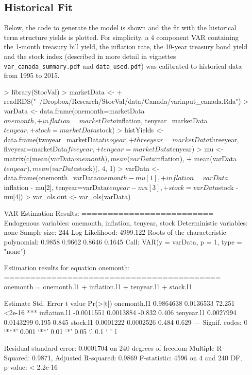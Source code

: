 \documentclass[12pt]{article}
\begin{document}
\subsection{Historical Fit}

\medskip
Below, the code to generate the model is shown and the fit with the historical term structure
yields is plotted. For simplicity, a 4 component VAR containing the 1-month treasury bill yield,
the inflation rate, the 10-year treasury bond yield and the stock index (described in more 
detail in vignettes \texttt{var\_canada\_summary.pdf} and \texttt{data\_used.pdf}) was calibrated
to historical data from 1995 to 2015.

\begin{Schunk}
\begin{Sinput}
> library(StocVal)
> marketData <- 
+   readRDS("~/Dropbox/Research/StocVal/data/Canada/varinput_canada.Rda")
> varData <- data.frame(onemonth=marketData$onemonth,
+   inflation=marketData$inflation, tenyear=marketData$tenyear,
+   stock=marketData$stock)
> histYields <- data.frame(twoyear=marketData$twoyear, 
+   threeyear=marketData$threeyear, fiveyear=marketData$fiveyear, 
+   tenyear=marketData$tenyear)
> mu <- matrix(c(mean(varData$onemonth), mean(varData$inflation),
+   mean(varData$tenyear), mean(varData$stock)), 4, 1)
> varData <- data.frame(onemonth=varData$onemonth - mu[1], 
+   inflation=varData$inflation - mu[2], tenyear=varData$tenyear-mu[3],
+   stock=varData$stock - mu[4])
> var_ols.out <- var_ols(varData)
\end{Sinput}
\begin{Soutput}
VAR Estimation Results:
========================= 
Endogenous variables: onemonth, inflation, tenyear, stock 
Deterministic variables: none 
Sample size: 244 
Log Likelihood: 4999.122 
Roots of the characteristic polynomial:
0.9858 0.9662 0.8646 0.1645
Call:
VAR(y = varData, p = 1, type = "none")


Estimation results for equation onemonth: 
========================================= 
onemonth = onemonth.l1 + inflation.l1 + tenyear.l1 + stock.l1 

               Estimate Std. Error t value Pr(>|t|)    
onemonth.l1   0.9864638  0.0136533  72.251   <2e-16 ***
inflation.l1 -0.0011551  0.0013884  -0.832    0.406    
tenyear.l1    0.0027994  0.0143299   0.195    0.845    
stock.l1      0.0001222  0.0002526   0.484    0.629    
---
Signif. codes:  0 ‘***’ 0.001 ‘**’ 0.01 ‘*’ 0.05 ‘.’ 0.1 ‘ ’ 1


Residual standard error: 0.0001704 on 240 degrees of freedom
Multiple R-Squared: 0.9871,	Adjusted R-squared: 0.9869 
F-statistic:  4596 on 4 and 240 DF,  p-value: < 2.2e-16 



\end{Soutput}
\end{Schunk}
\end{document}
